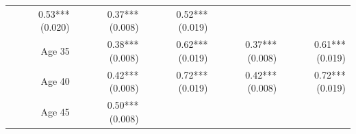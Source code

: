 \documentclass[]{article}
\begin{document}
\begin{longtable}[c]{@{}rrrrr@{}}
\begin{minipage}[t]{0.16\columnwidth}
0.53*** (0.020)
\strut\end{minipage} &
\begin{minipage}[t]{0.21\columnwidth}\raggedleft\strut
0.37*** (0.008)
\strut\end{minipage} &
\begin{minipage}[t]{0.15\columnwidth}\raggedleft\strut
0.52*** (0.019)
\strut\end{minipage}\tabularnewline
\begin{minipage}[t]{0.17\columnwidth}\raggedleft\strut
Age 35
\strut\end{minipage} &
\begin{minipage}[t]{0.18\columnwidth}\raggedleft\strut
0.38*** (0.008)
\strut\end{minipage} &
\begin{minipage}[t]{0.16\columnwidth}\raggedleft\strut
0.62*** (0.019)
\strut\end{minipage} &
\begin{minipage}[t]{0.21\columnwidth}\raggedleft\strut
0.37*** (0.008)
\strut\end{minipage} &
\begin{minipage}[t]{0.15\columnwidth}\raggedleft\strut
0.61*** (0.019)
\strut\end{minipage}\tabularnewline
\begin{minipage}[t]{0.17\columnwidth}\raggedleft\strut
Age 40
\strut\end{minipage} &
\begin{minipage}[t]{0.18\columnwidth}\raggedleft\strut
0.42*** (0.008)
\strut\end{minipage} &
\begin{minipage}[t]{0.16\columnwidth}\raggedleft\strut
0.72*** (0.019)
\strut\end{minipage} &
\begin{minipage}[t]{0.21\columnwidth}\raggedleft\strut
0.42*** (0.008)
\strut\end{minipage} &
\begin{minipage}[t]{0.15\columnwidth}\raggedleft\strut
0.72*** (0.019)
\strut\end{minipage}\tabularnewline
\begin{minipage}[t]{0.17\columnwidth}\raggedleft\strut
Age 45
\strut\end{minipage} &
\begin{minipage}[t]{0.18\columnwidth}\raggedleft\strut
0.50*** (0.008)
\strut\end{minipage} &
\begin{minipage}[t]{0.16\columnwidth}\raggedleft\strut

\end{minipage}
\end{longtable}
\end{document}
